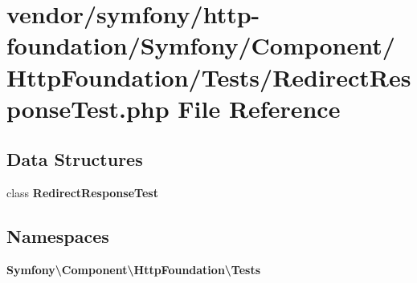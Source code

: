 \section{vendor/symfony/http-\/foundation/\+Symfony/\+Component/\+Http\+Foundation/\+Tests/\+Redirect\+Response\+Test.php File Reference}
\label{_redirect_response_test_8php}
\subsection*{Data Structures}
\begin{DoxyCompactItemize}
\item 
class {\bf Redirect\+Response\+Test}
\end{DoxyCompactItemize}
\subsection*{Namespaces}
\begin{DoxyCompactItemize}
\item 
 {\bf Symfony\textbackslash{}\+Component\textbackslash{}\+Http\+Foundation\textbackslash{}\+Tests}
\end{DoxyCompactItemize}

